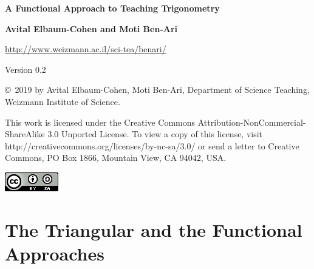 
\hypersetup{pageanchor=false}
\thispagestyle{empty}

\vspace*{2ex}

\begin{center}


\textbf{\LARGE A Functional Approach to Teaching Trigonometry}

\bigskip
\bigskip
\bigskip
\bigskip

\textbf{\Large Avital Elbaum-Cohen and Moti Ben-Ari}

\bigskip
\bigskip

\url{http://www.weizmann.ac.il/sci-tea/benari/}

\bigskip

Version 0.2

\end{center}


\vfill

\begin{footnotesize}
\begin{center}
\copyright{}\ 2019 by Avital Elbaum-Cohen, Moti Ben-Ari, Department of Science Teaching, Weizmann Institute of Science.
\end{center}

This work is licensed under the Creative Commons Attribution-NonCommercial-ShareAlike 3.0 Unported License. To view a copy of this license, visit http://creativecommons.org/licenses/by-nc-sa/3.0/ or send a letter to Creative Commons, PO Box 1866, Mountain View, CA 94042, USA.
\end{footnotesize}

\bigskip

\begin{center}
\includegraphics[width=.15\textwidth]{../../by-sa.png}
\end{center}


\newpage
\setlength\cftbeforetoctitleskip{4ex}
\setlength\cftaftertoctitleskip{2ex}
\setlength{}

\tableofcontents
\thispagestyle{empty}


\newpage
\hypersetup{pageanchor=true}

\setcounter{page}{1}

\chapter{The Triangular and the Functional Approaches}

